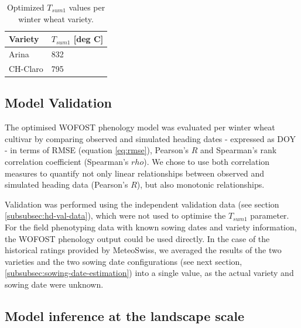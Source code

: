 \begin{table}[H]
\caption{Optimized $T_{sum1}$ values per winter wheat variety.}
\label{tab:tsum1-values}
\centering
\begin{tabular}{@{}ll@{}}
\toprule
Variety  & $T_{sum1}$ [deg C] \\ \midrule
Arina    & 832   \\
CH-Claro & 795   \\ \bottomrule
\end{tabular}
\end{table}

\subsection{Model Validation}
The optimised \gls{WOFOST} phenology model was evaluated per winter wheat cultivar by comparing observed and simulated heading dates - expressed as \gls{DOY} - in terms of \gls{RMSE} (equation \ref{eq:rmse}), Pearson's $R$ and Spearman's rank correlation coefficient (Spearman's $rho$). We chose to use both correlation measures to quantify not only linear relationships between observed and simulated heading data (Pearson's $R$), but also monotonic relationships.

Validation was performed using the independent validation data (see section \ref{subsubsec:hd-val-data}), which were not used to optimise the $T_{sum1}$ parameter. For the field phenotyping data with known sowing dates and variety information, the \gls{WOFOST} phenology output could be used directly. In the case of the historical ratings provided by MeteoSwiss, we averaged the results of the two varieties and the two sowing date configurations (see next section, \ref{subsubsec:sowing-date-estimation}) into a single value, as the actual variety and sowing date were unknown.

\subsection{Model inference at the landscape scale}

